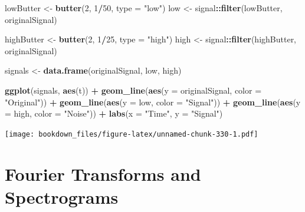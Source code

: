 \documentclass[
]{krantz}
\makeatletter
\newenvironment{Shaded}{\begin{snugshade}}{\end{snugshade}}
\newcommand{\DataTypeTok}[1]{\textcolor[rgb]{0.27,0.27,0.27}{#1}}
\newcommand{\DecValTok}[1]{\textcolor[rgb]{0.06,0.06,0.06}{#1}}
\newcommand{\KeywordTok}[1]{\textcolor[rgb]{0.27,0.27,0.27}{\textbf{#1}}}
\newcommand{\NormalTok}[1]{#1}
\newcommand{\OperatorTok}[1]{\textcolor[rgb]{0.43,0.43,0.43}{\textbf{#1}}}
\newcommand{\StringTok}[1]{\textcolor[rgb]{0.5,0.5,0.5}{#1}}
\newenvironment{kframe}{%
\medskip{}
\setlength{\fboxsep}{.8em}
 \def\at@end@of@kframe{}%
 \ifinner\ifhmode%
  \def\at@end@of@kframe{\end{minipage}}%
  \begin{minipage}{\columnwidth}%
 \fi\fi%
 \def\FrameCommand##1{\hskip\@totalleftmargin \hskip-\fboxsep
 \colorbox{shadecolor}{##1}\hskip-\fboxsep
     \hskip-\linewidth \hskip-\@totalleftmargin \hskip\columnwidth}%
 \MakeFramed {\advance\hsize-\width
   \@totalleftmargin\z@ \linewidth\hsize
   \@setminipage}}%
 {\par\unskip\endMakeFramed%
 \at@end@of@kframe}
\renewenvironment{Shaded}{\begin{kframe}}{\end{kframe}}
\makeatother
\begin{document}
\begin{Shaded}
\begin{Highlighting}[]
\NormalTok{lowButter \textless{}{-}}\StringTok{ }\KeywordTok{butter}\NormalTok{(}\DecValTok{2}\NormalTok{, }\DecValTok{1}\OperatorTok{/}\DecValTok{50}\NormalTok{, }\DataTypeTok{type =} \StringTok{"low"}\NormalTok{)}
\NormalTok{low \textless{}{-}}\StringTok{ }\NormalTok{signal}\OperatorTok{::}\KeywordTok{filter}\NormalTok{(lowButter, originalSignal)}

\NormalTok{highButter \textless{}{-}}\StringTok{ }\KeywordTok{butter}\NormalTok{(}\DecValTok{2}\NormalTok{, }\DecValTok{1}\OperatorTok{/}\DecValTok{25}\NormalTok{, }\DataTypeTok{type =} \StringTok{"high"}\NormalTok{)}
\NormalTok{high \textless{}{-}}\StringTok{ }\NormalTok{signal}\OperatorTok{::}\KeywordTok{filter}\NormalTok{(highButter, originalSignal)}

\NormalTok{signals \textless{}{-}}\StringTok{ }\KeywordTok{data.frame}\NormalTok{(originalSignal, low, high)}

\KeywordTok{ggplot}\NormalTok{(signals, }\KeywordTok{aes}\NormalTok{(t)) }\OperatorTok{+}\StringTok{ }
\StringTok{  }\KeywordTok{geom\_line}\NormalTok{(}\KeywordTok{aes}\NormalTok{(}\DataTypeTok{y =}\NormalTok{ originalSignal, }\DataTypeTok{color =} \StringTok{"Original"}\NormalTok{)) }\OperatorTok{+}\StringTok{ }
\StringTok{  }\KeywordTok{geom\_line}\NormalTok{(}\KeywordTok{aes}\NormalTok{(}\DataTypeTok{y =}\NormalTok{ low, }\DataTypeTok{color =} \StringTok{"Signal"}\NormalTok{)) }\OperatorTok{+}\StringTok{ }
\StringTok{  }\KeywordTok{geom\_line}\NormalTok{(}\KeywordTok{aes}\NormalTok{(}\DataTypeTok{y =}\NormalTok{ high, }\DataTypeTok{color =} \StringTok{"Noise"}\NormalTok{)) }\OperatorTok{+}\StringTok{ }
\StringTok{  }\KeywordTok{labs}\NormalTok{(}\DataTypeTok{x =} \StringTok{"Time"}\NormalTok{, }\DataTypeTok{y =} \StringTok{"Signal"}\NormalTok{)}
\end{Highlighting}
\end{Shaded}

\texttt{[image: bookdown\_files/figure-latex/unnamed-chunk-330-1.pdf]}

\hypertarget{fourier-transforms-and-spectrograms}{%
\section{Fourier Transforms and Spectrograms}\label{fourier-transforms-and-spectrograms}}
\end{document}
